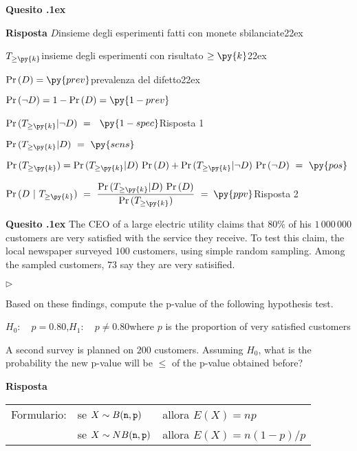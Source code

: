 \documentclass[11pt,twoside,a4paper]{article}
\newcommand{\mylabel}[1]{#1\hfill}
\renewenvironment{itemize}
  {\begin{list}{$\triangleright$}{%
   \setlength{\parskip}{0mm}
   \setlength{\topsep}{.4\baselineskip}
   \setlength{\rightmargin}{0mm}
   \setlength{\listparindent}{0mm}
   \setlength{\itemindent}{0mm}
   \setlength{\labelwidth}{2ex}
   \setlength{\itemsep}{.4\baselineskip}
   \setlength{\parsep}{0mm}
   \setlength{\partopsep}{0mm}
   \setlength{\labelsep}{1ex}
   \setlength{\leftmargin}{\labelwidth+\labelsep}
   \let\makelabel\mylabel}}{%
   \end{list}\vspace*{-1.3mm}}
\newcounter{quesito}
\newenvironment{question}{\addtocounter{quesito}{1}\par\textbf{Quesito \thequesito.\kern1ex}}{\vspace{0.5\parskip}}
\newenvironment{answer}{\par\textbf{Risposta\quad}}{\vspace{\parskip}}
\begin{document}
\begin{question}
\begin{answer}
$D$\hfill insieme degli esperimenti fatti con monete sbilanciate\kern22ex

$T_{\ge\py{k}}$\hfill insieme degli esperimenti con risultato $\ge\py{k}$\kern22ex

$\Pr(D)=\py{prev}$\hfill prevalenza del difetto\kern22ex

$\Pr(\neg D)=1-\Pr(D)=\py{1-prev}$

$\Pr(T_{\ge\py{k}}| \neg D)\ =\kern1ex${\color{blue} $\py{1-spec}$\hfill Risposta 1} 

$\Pr(T_{\ge\py{k}}| D)\ =\ \py{sens}$

$\Pr(T_{\ge\py{k}})=\Pr(T_{\ge\py{k}}|D)\ \Pr(D) + \Pr(T_{\ge\py{k}}|\neg D)\ \Pr(\neg D)\ =\ \py{pos}$

$\displaystyle\Pr(D ~|~T_{\ge\py{k}})\ =\ \frac{\Pr(T_{\ge\py{k}}| D)\ \Pr(D)}{\Pr(T_{\ge\py{k}})}\ =\kern1ex${\color{blue}$\py{ppv}$\hfill Risposta 2}

\end{answer}
\end{question}



\begin{question}
The CEO of a large electric utility claims that $80\%$ of his $1\,000\,000$ customers are very satisfied with the service they receive. To test this claim, the local newspaper surveyed $100$ customers, using simple random sampling. Among the sampled customers, $73$ say they are very satisified. 

\begin{itemize}
\item[1.] Based on these findings, compute the p-value of the following hypothesis test.

$H_0:\quad p = 0.80$,\qquad $H_1:\quad p \neq 0.80$\hfill  where $p$ is the proportion of very satisfied customers

\item[2.] A second survey is planned on $200$ customers. Assuming $H_0$, what is the probability the new p-value will be $\le$ of the p-value obtained before?
\end{itemize}
\begin{answer}



\end{answer}
\end{question}
\vfill
\hrulefill

\begin{tabular}{@{}lll}
Formulario:& se $X\sim B({\tt n},{\tt p})$ & allora $E(X)=np$\\
           & se $X\sim NB({\tt n},{\tt p})$& allora $E(X)=n(1-p)/p$
\end{tabular}
\end{document}
